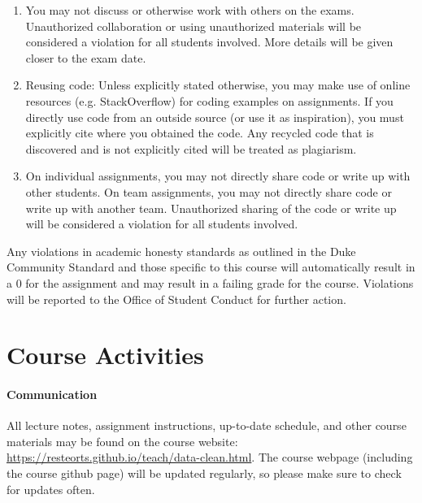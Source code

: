 \documentclass[11pt]{article}
\begin{document}
\begin{enumerate}
\item You may not discuss or otherwise work with others on the exams. Unauthorized collaboration or using unauthorized materials will be considered a violation for all students involved. More details will be given closer to the exam date.
\item Reusing code: Unless explicitly stated otherwise, you may make use of online resources (e.g. StackOverflow) for coding examples on assignments. If you directly use code from an outside source (or use it as inspiration), you must explicitly cite where you obtained the code. Any recycled code that is discovered and is not explicitly cited will be treated as plagiarism.
\item On individual assignments, you may not directly share code or write up with other students. On team assignments, you may not directly share code or write up with another team. Unauthorized sharing of the code or write up will be considered a violation for all students involved.
\end{enumerate}

Any violations in academic honesty standards as outlined in the Duke Community Standard and those specific to this course will automatically result in a 0 for the assignment and may result in a failing grade for the course. Violations will be reported to the Office of Student Conduct for further action.















\section{Course Activities}

\paragraph{Communication} 
All lecture notes, assignment instructions, up-to-date schedule, and other course materials may be found on the course website: \url{https://resteorts.github.io/teach/data-clean.html}. The course webpage (including the course github page) will be updated regularly, so please make sure to check for updates often. \\
\end{document}

